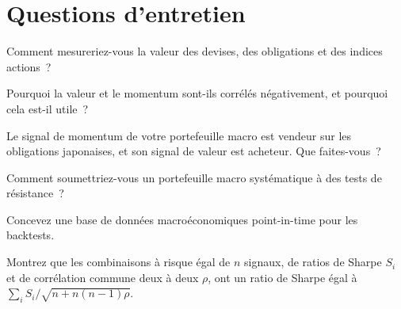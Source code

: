 \section{Questions d'entretien}

\begin{interviewq}\label{iq:s2:systematic-macro:1}
Comment mesureriez-vous la valeur des devises, des obligations et des indices actions~?
\end{interviewq}

\begin{interviewq}\label{iq:s2:systematic-macro:2}
Pourquoi la valeur et le momentum sont-ils corrélés négativement, et pourquoi cela est-il utile~?
\end{interviewq}

\begin{interviewq}\label{iq:s2:systematic-macro:3}
Le signal de momentum de votre portefeuille macro est vendeur sur les obligations japonaises, et son signal de valeur est acheteur. Que faites-vous~?
\end{interviewq}

\begin{interviewq}\label{iq:s2:systematic-macro:4}
Comment soumettriez-vous un portefeuille macro systématique à des tests de résistance~?
\end{interviewq}

\begin{interviewq}\label{iq:s2:systematic-macro:5}
Concevez une base de données macroéconomiques point-in-time pour les backtests.
\end{interviewq}

\begin{interviewq}\label{iq:s2:systematic-macro:6}
Montrez que les combinaisons à risque égal de $n$ signaux, de ratios de Sharpe $S_i$ et de corrélation commune deux à deux $\rho$, ont un ratio de Sharpe égal à $\sum_i S_i /
\sqrt{n + n(n - 1)\rho}$.
\end{interviewq}
